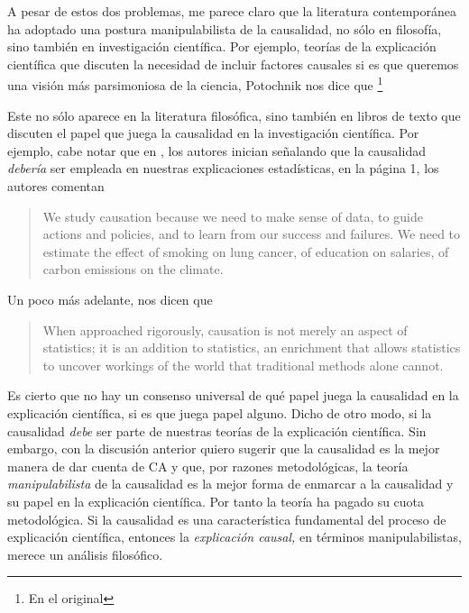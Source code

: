 
A pesar de estos dos problemas, me parece claro que la
literatura contemporánea ha adoptado una postura
manipulabilista de la causalidad, no sólo en filosofía, sino
también en investigación científica. Por ejemplo, teorías de
la explicación científica que discuten la necesidad de
incluir factores causales si es que queremos una visión más
parsimoniosa de la ciencia, Potochnik nos dice que
\footnote{
  En el original 
}
\parencite[][p.~24]{Potochnik2017-POTIAT-3}

Este  no sólo aparece en la literatura
filosófica, sino también en libros de texto que discuten el
papel que juega la causalidad en la investigación
científica. Por ejemplo, cabe notar que en \cite{Pearl2016},
los autores  inician señalando que la causalidad
\emph{debería} ser empleada en nuestras explicaciones
estadísticas, en la página 1, los autores comentan

	\begin{quote}
  	We study causation because we need to make sense of
	  data, to guide actions and policies, and to learn from
	  our success and failures. We need to estimate the effect
	  of smoking on lung cancer, of education on salaries, of
	  carbon emissions on the climate.
	\end{quote}

Un poco más adelante, nos dicen que

	\begin{quote}
	  When approached rigorously, causation is not merely an
	  aspect of statistics; it is an addition to statistics, 
	  an enrichment that allows statistics to uncover workings
	  of the world that traditional methods alone cannot.
	\end{quote}


Es cierto que no hay un consenso universal de qué papel
juega la causalidad en la explicación científica, si es que
juega papel alguno. Dicho de otro modo, si la causalidad
\emph{debe} ser parte de nuestras teorías de la
explicación científica. Sin embargo, con la discusión
anterior quiero sugerir que la causalidad es la mejor manera
de dar cuenta de CA y que, por razones metodológicas, la
teoría \emph{manipulabilista} de la causalidad es la mejor
forma de enmarcar a la causalidad y su papel en la
explicación científica. Por tanto la teoría ha pagado su
cuota metodológica. Si la causalidad es una característica
fundamental del proceso de explicación científica, entonces
la \emph{explicación causal,} en términos manipulabilistas,
merece un análisis filosófico.

